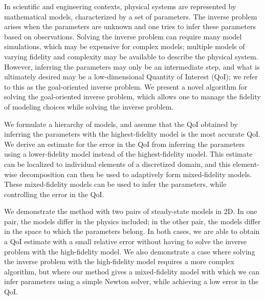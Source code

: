 In scientific and engineering contexts, physical systems are represented by mathematical models, characterized by a set of parameters. The inverse problem arises when the parameters are unknown and one tries to infer these parameters based on observations. Solving the inverse problem can require many model simulations, which may be expensive for complex models; multiple models of varying fidelity and complexity may be available to describe the physical system. However, inferring the parameters may only be an intermediate step, and what is ultimately desired may be a low-dimensional Quantity of Interest (QoI); we refer to this as the goal-oriented inverse problem. We present a novel algorithm for solving the goal-oriented inverse problem, which allows one to manage the fidelity of modeling choices while solving the inverse problem.

We formulate a hierarchy of models, and assume that the QoI obtained by inferring the parameters with the highest-fidelity model is the most accurate QoI. We derive an estimate for the error in the QoI from inferring the parameters using a lower-fidelity model instead of the highest-fidelity model. This estimate can be localized to individual elements of a discretized domain, and this element-wise decomposition can then be used to adaptively form mixed-fidelity models. These mixed-fidelity models can be used to infer the parameters, while controlling the error in the QoI.

We demonstrate the method with two pairs of steady-state models in 2D. In one pair, the models differ in the physics included; in the other pair, the models differ in the space to which the parameters belong. In both cases, we are able to obtain a QoI estimate with a small relative error without having to solve the inverse problem with the high-fidelity model. We also demonstrate a case where solving the inverse problem with the high-fidelity model requires a more complex algorithm, but where our method gives a mixed-fidelity model with which we can infer parameters using a simple Newton solver, while achieving a low error in the QoI.

